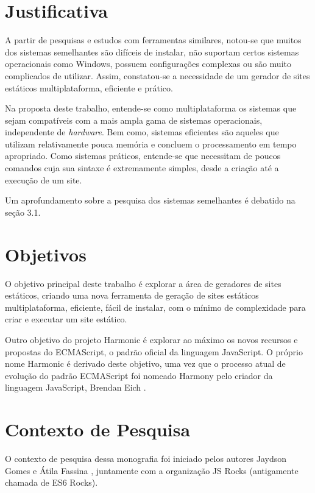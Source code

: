 \documentclass[ppginf, pep]{esinucpel}
\begin{document}
\section{Justificativa}

A partir de pesquisas e estudos com ferramentas similares, notou-se que muitos dos sistemas semelhantes são difíceis de instalar, não suportam certos sistemas operacionais como Windows, possuem configurações complexas ou são muito complicados de utilizar. Assim, constatou-se a necessidade de um gerador de sites estáticos multiplataforma, eficiente e prático.

Na proposta deste trabalho, entende-se como multiplataforma os sistemas que sejam compatíveis com a mais ampla gama de sistemas operacionais, independente de \textit{hardware}. Bem como, sistemas eficientes são aqueles que utilizam relativamente pouca memória e concluem o processamento em tempo apropriado. Como sistemas práticos, entende-se que necessitam de poucos comandos cuja sua sintaxe é extremamente simples, desde a criação até a execução de um site.

Um aprofundamento sobre a pesquisa dos sistemas semelhantes é debatido na seção 3.1.

\section{Objetivos}

O objetivo principal deste trabalho é explorar a área de geradores de sites estáticos, criando uma nova ferramenta de geração de sites estáticos multiplataforma, eficiente, fácil de instalar, com o mínimo de complexidade para criar e executar um site estático.

Outro objetivo do projeto Harmonic é explorar ao máximo os novos recursos e propostas do ECMAScript, o padrão oficial da linguagem JavaScript. O próprio nome Harmonic é derivado deste objetivo, uma vez que o processo atual de evolução do padrão ECMAScript foi nomeado Harmony pelo criador da linguagem JavaScript, Brendan Eich \cite{harmony}.

\section{Contexto de Pesquisa}

O contexto de pesquisa dessa monografia foi iniciado pelos autores Jaydson Gomes \cite{jaydson} e Átila Fassina \cite{atila}, juntamente com a organização JS Rocks \cite{jsrocks} (antigamente chamada de ES6 Rocks).
\end{document}
